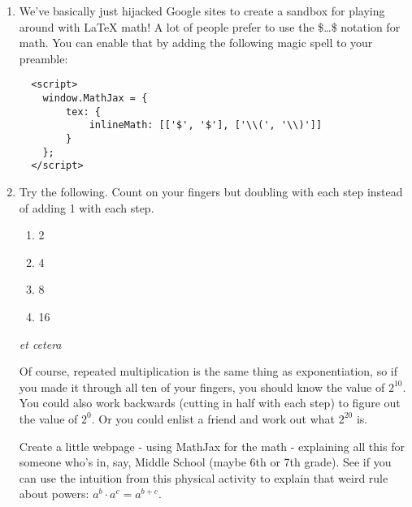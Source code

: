 \begin{enumerate}
\item We've basically just hijacked Google sites to create a sandbox for playing around with \LaTeX{} math!  A lot of people prefer to use the \$\dots\$ notation for math.  You can enable that by adding the following magic spell to your preamble:
\begin{codeblock}
\begin{verbatim}
  <script>
    window.MathJax = {
        tex: {
            inlineMath: [['$', '$'], ['\\(', '\\)']]
        }
    };
  </script>
\end{verbatim}
\end{codeblock}
\item Try the following.  Count on your fingers but doubling with each step instead of adding 1 with each step. 
\begin{enumerate}
  \item 2
  \item 4
  \item 8
  \item 16
\end{enumerate}
{\it et cetera}

Of course, repeated multiplication is the same thing as exponentiation, so if you made it through all ten of your fingers, you should know the value of $2^{10}$.  You could also work backwards (cutting in half with each step) to figure out the value of $2^0$.  Or you could enlist a friend and work out what $2^{20}$ is.

Create a little webpage - using MathJax for the math - explaining all this for someone who's in, say, Middle School (maybe 6th or 7th grade).  See if you can use the intuition from this physical activity to explain that weird rule about powers: $a^b \cdot a^c = a^{b+c}$.
\end{enumerate}
